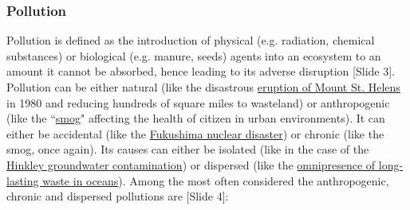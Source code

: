 \documentclass{article}
\begin{document}
\subsubsection{Pollution}
\label{sec:pollution}
Pollution is defined as the introduction of physical (e.g. radiation, chemical substances) or biological (e.g. manure, seeds) agents into an ecosystem to an amount it cannot be absorbed, hence leading to its adverse disruption {\color{blue}[Slide 3]}. Pollution can be either natural (like the disastrous \href{https://en.wikipedia.org/wiki/1980_eruption_of_Mount_St._Helens}{eruption of Mount St. Helens} in 1980 and reducing hundreds of square miles to wasteland) or anthropogenic (like the ``\href{https://en.wikipedia.org/wiki/Smog}{smog}" affecting the health of citizen in urban environments). It can either be accidental (like the \href{https://en.wikipedia.org/wiki/Fukushima_Daiichi_nuclear_disaster}{Fukushima nuclear disaster}) or chronic (like the smog, once again). Its causes can either be isolated (like in the case of the \href{https://en.wikipedia.org/wiki/Hinkley_groundwater_contamination}{Hinkley groundwater contamination}) or dispersed (like the \href{https://en.wikipedia.org/wiki/Marine_debris}{omnipresence of long-lasting waste in oceans}). Among the most often considered the anthropogenic, chronic and dispersed pollutions are {\color{blue}[Slide 4]}:
\end{document}
